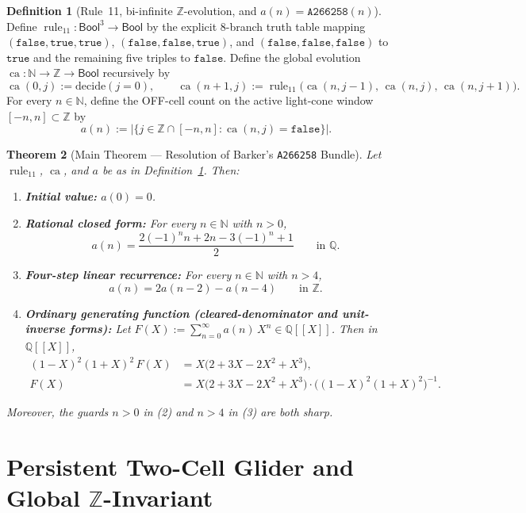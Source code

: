 \documentclass[11pt]{article}
\newcommand{\llbracket}{[\![}
\newcommand{\rrbracket}{]\!]}
\newtheorem{theorem}{Theorem}[section]
\theoremstyle{definition}
\newtheorem{definition}[theorem]{Definition}
\newcommand{\N}{\mathbb{N}}
\newcommand{\Z}{\mathbb{Z}}
\newcommand{\Q}{\mathbb{Q}}
\newcommand{\seq}[1]{\texttt{#1}}
\newcommand{\ruleTT}{\operatorname{rule}_{11}}
\newcommand{\ca}{\operatorname{ca}}
\begin{document}
\begin{definition}[Rule~11, bi-infinite $\Z$-evolution, and $a(n) = \seq{A266258}(n)$]
\label{def:c054}
Define $\ruleTT : \mathsf{Bool}^3 \to \mathsf{Bool}$ by the explicit $8$-branch truth table mapping $(\mathtt{false}, \mathtt{true}, \mathtt{true})$, $(\mathtt{false}, \mathtt{false}, \mathtt{true})$, and $(\mathtt{false}, \mathtt{false}, \mathtt{false})$ to $\mathtt{true}$ and the remaining five triples to $\mathtt{false}$. Define the global evolution $\ca : \N \to \Z \to \mathsf{Bool}$ recursively by
\[
\ca(0, j) := \mathrm{decide}(j = 0), \qquad
\ca(n + 1, j) := \ruleTT\bigl(\ca(n, j - 1),\, \ca(n, j),\, \ca(n, j + 1)\bigr).
\]
For every $n \in \N$, define the OFF-cell count on the active light-cone window $[-n, n] \subset \Z$ by
\[
a(n) := \bigl|\{j \in \Z \cap [-n, n] : \ca(n, j) = \mathtt{false}\}\bigr|.
\]
\end{definition}

\begin{theorem}[Main Theorem --- Resolution of Barker's \seq{A266258} Bundle]
\label{thm:main}
Let $\ruleTT$, $\ca$, and $a$ be as in Definition~\ref{def:c054}. Then:
\begin{enumerate}
\item[\textup{(1)}] \textbf{Initial value:} $a(0) = 0$.
\item[\textup{(2)}] \textbf{Rational closed form:} For every $n \in \N$ with $n > 0$,
\[
a(n) = \frac{2(-1)^n n + 2n - 3(-1)^n + 1}{2} \qquad \text{in }\Q.
\]
\item[\textup{(3)}] \textbf{Four-step linear recurrence:} For every $n \in \N$ with $n > 4$,
\[
a(n) = 2a(n - 2) - a(n - 4) \qquad \text{in }\Z.
\]
\item[\textup{(4)}] \textbf{Ordinary generating function (cleared-denominator and unit-inverse forms):} Let $F(X) := \sum_{n=0}^{\infty} a(n)\,X^n \in \Q\llbracket X \rrbracket$. Then in $\Q\llbracket X \rrbracket$,
\begin{align*}
(1 - X)^2 (1 + X)^2 \, F(X) &= X\bigl(2 + 3X - 2X^2 + X^3\bigr), \\
F(X) &= X\bigl(2 + 3X - 2X^2 + X^3\bigr) \cdot \bigl((1 - X)^2 (1 + X)^2\bigr)^{-1}.
\end{align*}
\end{enumerate}
Moreover, the guards $n > 0$ in \textup{(2)} and $n > 4$ in \textup{(3)} are both sharp.
\end{theorem}

\section{Persistent Two-Cell Glider and Global \texorpdfstring{$\Z$}{Z}-Invariant}
\end{document}
